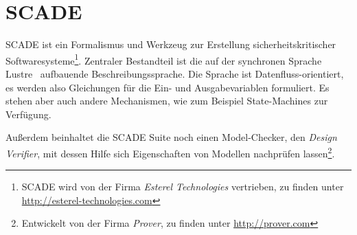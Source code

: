 \section{SCADE}
\label{sec:scade}
SCADE ist ein Formalismus und Werkzeug zur Erstellung sicherheitskritischer Softwaresysteme\footnote{SCADE wird von der Firma \emph{Esterel Technologies} vertrieben, zu finden unter \url{http://esterel-technologies.com}}.
Zentraler Bestandteil ist die auf der synchronen Sprache Lustre~\cite{lustre} aufbauende Beschreibungssprache.
Die Sprache ist Datenfluss-orientiert, es werden also Gleichungen für die Ein- und Ausgabevariablen formuliert.
Es stehen aber auch andere Mechanismen, wie zum Beispiel State-Machines zur Verfügung.

Außerdem beinhaltet die SCADE Suite noch einen Model-Checker, den \emph{Design Verifier}, mit dessen Hilfe sich Eigenschaften von Modellen nachprüfen lassen\footnote{Entwickelt von der Firma \emph{Prover}, zu finden unter \url{http://prover.com}}.